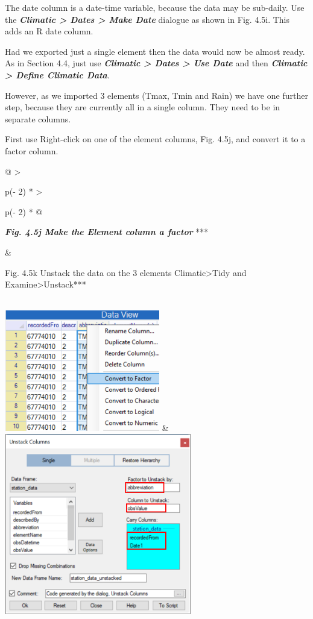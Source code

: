 \documentclass[
  letterpaper,
  DIV=11,
  numbers=noendperiod]{scrreprt}
\begin{document}
The date column is a date-time variable, because the data may be
sub-daily. Use the \textbf{\emph{Climatic \textgreater{} Dates
\textgreater{} Make Date}} dialogue as shown in Fig. 4.5i. This adds an
R date column.

Had we exported just a single element then the data would now be almost
ready. As in Section 4.4, just use \textbf{\emph{Climatic \textgreater{}
Dates \textgreater{} Use Date}} and then \textbf{\emph{Climatic
\textgreater{} Define Climatic Data}}.

However, as we imported 3 elements (Tmax, Tmin and Rain) we have one
further step, because they are currently all in a single column. They
need to be in separate columns.

First use Right-click on one of the element columns, Fig. 4.5j, and
convert it to a factor column.

\begin{longtable}[]{@{}
  >{\raggedright\arraybackslash}p{(\columnwidth - 2\tabcolsep) * }
  >{\raggedright\arraybackslash}p{(\columnwidth - 2\tabcolsep) * }@{}}
\toprule\noalign{}
\begin{minipage}[b]{\linewidth}\raggedright
\textbf{\emph{Fig. 4.5j Make the Element column a factor}} ***
\end{minipage} & \begin{minipage}[b]{\linewidth}\raggedright
Fig. 4.5k Unstack the data on the 3 elements Climatic\textgreater Tidy
and Examine\textgreater Unstack***
\end{minipage} \\
\midrule\noalign{}
\endhead
\bottomrule\noalign{}
\endlastfoot
\includegraphics[width=2.6682in,height=2.08108in]{figures/Fig4.5j.png} &
\includegraphics[width=3.215in,height=3.11831in]{figures/Fig4.5k.png} \\
\end{longtable}
\end{document}
